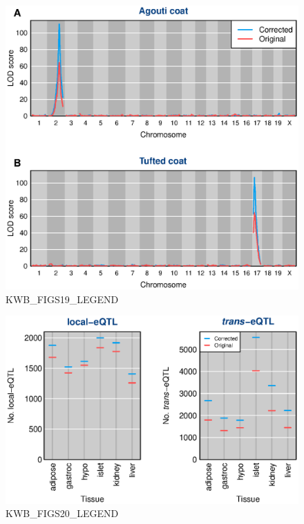 \documentclass[letterpaper,twoside]{article}
\begin{document}
\clearpage




\begin{figure}[p]
\centerline{\includegraphics{SuppFigs/figS19.eps}}

\caption{KWB_FIGS19_LEGEND}
\end{figure}




\begin{figure}[p]
\centerline{\includegraphics{SuppFigs/figS20.eps}}

\caption{KWB_FIGS20_LEGEND}
\end{figure}




\clearpage

\renewcommand{\arraystretch}{1.5}


\clearpage



\clearpage



\clearpage



\clearpage


\end{document}
